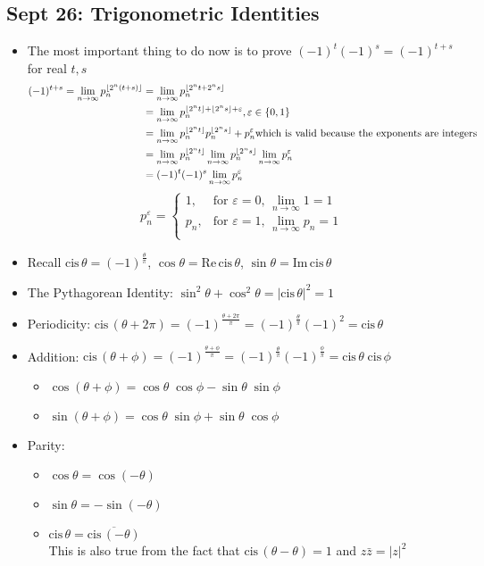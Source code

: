 \documentclass[10pt, oneside]{article}
\newcommand{\lti}[1]{\lim_{#1 \rightarrow \infty}}
\DeclarePairedDelimiter\floor{\lfloor}{\rfloor}
\newcommand{\cis}{\text{cis} \,}
\renewcommand{\Re}{\text{Re} \,}
\renewcommand{\Im}{\text{Im} \,}
\begin{document}
\subsection{Sept 26: Trigonometric Identities}
\begin{itemize}
    \item The most important thing to do now is to prove $(-1)^t (-1)^s = (-1)^{t+s}$ for real $t, s$
        \begin{align*}
            (-1)^{t+s} = \lti{n} p_n^{\floor{2^n (t + s)}} & = \lti{n}  p_n^{\floor{2^n t + 2^n s}}\\
            & = \lti{n}  p_n^{\floor{2^n t} + \floor{2^n s} + \varepsilon}, \varepsilon \in \{0,1\}\\
            & = \lti{n}  p_n^{\floor{2^n t}} p_n^{\floor{2^n s}} + p_n^\varepsilon \text{which is valid because the exponents are integers}\\
            & = \lti{n}  p_n^{\floor{2^n t}} \lti{n}  p_n^{\floor{2^n s}} \lti{n}  p_n^\varepsilon\\
            & = (-1)^t (-1)^s \lti{n} p_n^\varepsilon
        \end{align*}
        \[p_n^\varepsilon = 
            \begin{cases}
                1, & \text{for } \varepsilon = 0, \, \lti{n} 1 = 1\\
                p_n, & \text{for } \varepsilon = 1, \, \lti{n} p_n = 1\\
            \end{cases}\]
    \item Recall $\cis \theta = (-1)^{\frac{\theta}{\pi}}$, $\cos \theta = \Re \cis \theta$, $\sin \theta = \Im \cis \theta$
    \item The Pythagorean Identity: $\sin^2 \theta + \cos^2 \theta = |\cis \theta|^2 = 1$
    \item Periodicity: $\cis (\theta + 2\pi) = (-1)^{\frac{\theta + 2\pi}{\pi}} = (-1)^{\frac{\theta}{\pi}} (-1)^2 = \cis \theta$
    \item Addition: $\cis(\theta + \phi) = (-1)^{\frac{\theta + \phi}{\pi}} = (-1)^{\frac{\theta}{\pi}} (-1)^{\frac{\phi}{\pi}} = \cis \theta \; \cis \phi$
        \begin{itemize}
            \item $\cos(\theta + \phi) = \cos \theta \; \cos \phi - \sin \theta \; \sin \phi$
            \item $\sin(\theta + \phi) = \cos \theta \; \sin \phi + \sin \theta \; \cos \phi$
        \end{itemize}
    \item Parity: 
        \begin{itemize}
            \item $\cos \theta = \cos (- \theta)$
            \item $\sin \theta = - \sin (- \theta)$
            \item $\cis \theta = \overline{\cis (-\theta)}$\\
                This is also true from the fact that $\cis(\theta - \theta) = 1$ and $z \bar{z} = |z|^2$
        \end{itemize}
\end{itemize}
\end{document}
